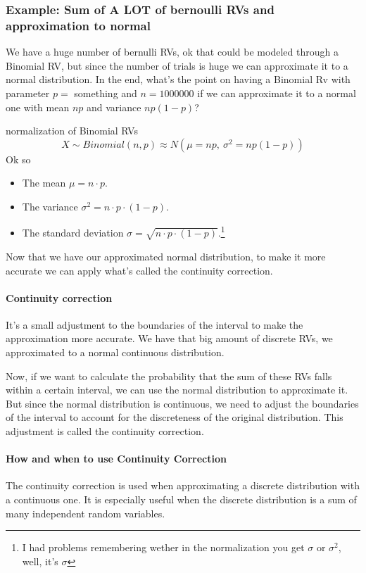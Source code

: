 \documentclass[a4paper]{article}
\newenvironment{focus}{\begin{focusbox}}{\end{focusbox}}
\begin{document}
\subsubsection{Example: Sum of A LOT of bernoulli RVs and approximation to normal}
We have a huge number of bernulli RVs, ok that could be modeled through a Binomial RV, but since the number of trials is huge we can approximate it to a normal distribution. In the end, what's the point on having a Binomial Rv with parameter $p =$ something and $n = 1000000$ if we can approximate it to a normal one with mean $np$ and variance $np(1-p)$?
\begin{focus}{normalization of Binomial RVs}
$$X \sim Binomial(n, p) \approx N(\mu = np,\ \sigma^2 = np(1-p))$$
Ok so \begin{itemize}
    \item The mean $\mu = n\cdot p$.
    \item The variance $\sigma^2 = n\cdot p \cdot (1-p)$.
    \item The standard deviation $\sigma = \sqrt{n\cdot p \cdot (1-p)}$.\footnote{I had problems remembering wether in the normalization you get $\sigma$ or $\sigma^2$, well, it's $\sigma$}
\end{itemize}
\end{focus}

Now that we have our approximated normal distribution, to make it more accurate we can apply what's called the continuity correction. 

\paragraph{Continuity correction} It's a small adjustment to the boundaries of the interval to make the approximation more accurate.
We have that big amount of discrete RVs, we approximated to a normal continuous distribution.

Now, if we want to calculate the probability that the sum of these RVs falls within a certain interval, we can use the normal distribution to approximate it. But since the normal distribution is continuous, we need to adjust the boundaries of the interval to account for the discreteness of the original distribution. This adjustment is called the continuity correction.

\paragraph{How and when to use Continuity Correction} The continuity correction is used when approximating a discrete distribution with a continuous one. 
It is especially useful when the discrete distribution is a sum of many independent random variables.
\end{document}
